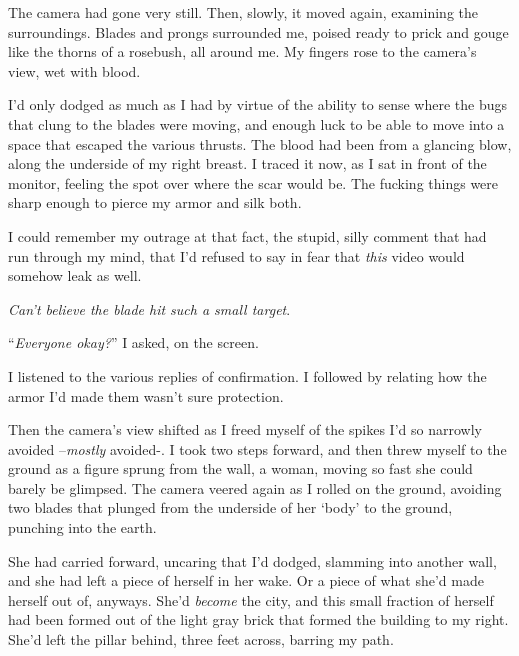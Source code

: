 The camera had gone very still.  Then, slowly, it moved again, examining the surroundings.  Blades and prongs surrounded me, poised ready to prick and gouge like the thorns of a rosebush, all around me.  My fingers rose to the camera's view, wet with blood.



I'd only dodged as much as I had by virtue of the ability to sense where the bugs that clung to the blades were moving, and enough luck to be able to move into a space that escaped the various thrusts.  The blood had been from a glancing blow, along the underside of my right breast.  I traced it now, as I sat in front of the monitor, feeling the spot over where the scar would be.  The fucking things were sharp enough to pierce my armor and silk both.



I could remember my outrage at that fact, the stupid, silly comment that had run through my mind, that I'd refused to say in fear that \emph{this} video would somehow leak as well.



\emph{Can't believe the blade hit such a small target}.



``\emph{Everyone okay?}'' I asked, on the screen.



I listened to the various replies of confirmation.  I followed by relating how the armor I'd made them wasn't sure protection.



Then the camera's view shifted as I freed myself of the spikes I'd so narrowly avoided –\emph{mostly} avoided-.  I took two steps forward, and then threw myself to the ground as a figure sprung from the wall, a woman, moving so fast she could barely be glimpsed.  The camera veered again as I rolled on the ground, avoiding two blades that plunged from the underside of her `body' to the ground, punching into the earth.



She had carried forward, uncaring that I'd dodged, slamming into another wall, and she had left a piece of herself in her wake.  Or a piece of what she'd made herself out of, anyways.  She'd \emph{become} the city, and this small fraction of herself had been formed out of the light gray brick that formed the building to my right.  She'd left the pillar behind, three feet across, barring my path.



